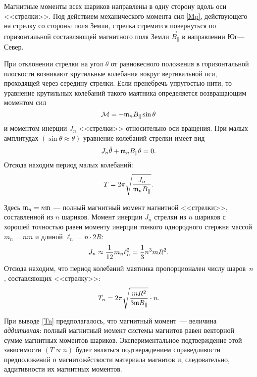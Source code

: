 Магнитные моменты всех шариков направлены в одну сторону вдоль оси <<стрелки>>. Под действием
механического момента сил \eqref{Mp}, действующего на стрелку со стороны
поля Земли, стрелка стремится повернуться по горизонтальной составляющей 
магнитного поля Земли $\vec B_{\parallel}$ в направлении Юг---Север.


При отклонении стрелки на угол $\theta$ от равновесного положения 
в горизонтальной плоскости возникают крутильные колебания вокруг 
вертикальной оси, проходящей через середину стрелки. Если пренебречь 
упругостью нити, то уравнение крутильных колебаний такого маятника
определяется возвращающим моментом сил
\[
\mathcal{M}=-\mathfrak{m}_n B_{\parallel}\sin \theta
\]
и моментом инерции $J_n$ <<стрелки>> относительно оси вращения. 
При малых амплитудах  $(\sin \theta \approx \theta)$ уравнение колебаний
стрелки имеет вид
\begin{equation*}
J_n \ddot{\theta} + \mathfrak{m}_n B_{\parallel} \theta = 0.
\end{equation*}
Отсюда находим период малых колебаний:
\begin{equation}
T=2\pi \sqrt{\frac{J_n}{\mathfrak{m}_n B_{\parallel}}}.
\end{equation}

Здесь $\mathfrak{m}_n = n \mathfrak{m}$ --- полный магнитный момент магнитной <<стрелки>>, 
составленной из $n$ шариков.
Момент инерции $J_n$ стрелки из $n$ шариков с хорошей точностью равен 
моменту инерции тонкого однородного стержня массой $m_n = nm$
и длиной $\ell_n = n \cdot 2R$:
\begin{equation}\eqmark{Jn}
J_n \approx \frac{1}{12} m_n \ell_n^2 = \frac{1}{3}n^3 m R^2.
\end{equation}
Отсюда находим, что период колебаний маятника 
пропорционален числу шаров~$n$, составляющих <<стрелку>>:
\begin{equation}\eqmark{Tn}
T_n=2\pi \sqrt{\frac{mR^2}{3\mm B_{\parallel}}} \cdot n.
\end{equation}

При выводе \eqref{Tn} предполагалось, что магнитный момент~--- величина
\emph{аддитивная}: полный магнитный момент системы магнитов равен
векторной сумме магнитных моментов шариков.
Экспериментальное подтверждение этой зависимости $(T \propto n)$ будет являться
подтверждением справедливости предположений о магнитожёсткости материала
магнитов и, следовательно, аддитивности их магнитных моментов.


